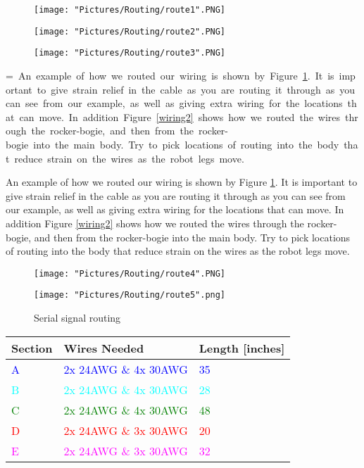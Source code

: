 \documentclass[12pt]{article}
\makeatletter
\newcommand{\mybox}[1]{%
  \setbox0=\hbox{#1}%
  \setlength{\@tempdima}{\dimexpr\wd0+13pt}%
  \begin{tcolorbox}[colframe=mycolor,boxrule=0.5pt,arc=4pt,
      left=6pt,right=6pt,top=6pt,bottom=6pt,boxsep=0pt,width=0.95\textwidth]
    #1
  \end{tcolorbox}
}
\makeatother
\begin{document}

\begin{figure}[H]
  	\centering
  	\begin{minipage}[b]{0.34\textwidth}
    		\texttt{[image: "Pictures/Routing/route1".PNG]}
  	\end{minipage}
  	\hfill
  	\begin{minipage}[b]{0.29\textwidth}
    		\texttt{[image: "Pictures/Routing/route2".PNG]}
  	\end{minipage}
    	\hfill
  	\begin{minipage}[b]{0.30\textwidth}
    		\texttt{[image: "Pictures/Routing/route3".PNG]}
  	\end{minipage}
  	\caption{}
	\label{wiring1}
\end{figure}


\mybox{
An example of how we routed our wiring is shown by Figure \ref{wiring1}. It is important to give strain relief in the cable as you are routing it through as you can see from our example, as well as giving extra wiring for the locations that can move. In addition Figure \ref{wiring2} shows how we routed the wires through the rocker-bogie, and then from the rocker-bogie into the main body. Try to pick locations of routing into the body that reduce strain on the wires as the robot legs move.
}

\begin{figure}[H]
 	\centering
  	\begin{minipage}[b]{0.48\textwidth}
		\texttt{[image: "Pictures/Routing/route4".PNG]}
  	\end{minipage}
  	\hfill
  	\begin{minipage}[b]{0.42\textwidth}
    		\texttt{[image: "Pictures/Routing/route5".png]}
  	\end{minipage}
	\caption{Serial signal routing}
	\label{ss2rc2}
\end{figure}




\begin{tabular}[3] {| p{2cm} | p{7cm} | p{4cm} |}
	\hline
	\textbf{Section} & \textbf{Wires Needed} & \textbf{Length [inches]}  \\ \hline
	\textcolor{blue}{A} & \textcolor{blue}{2x 24AWG \& 4x 30AWG} & \textcolor{blue}{35} \\ \hline
	\textcolor{cyan}{B} & \textcolor{cyan}{2x 24AWG \& 4x 30AWG} & \textcolor{cyan}{28} \\ \hline
	\textcolor{green}{C} & \textcolor{green}{2x 24AWG \& 4x 30AWG} & \textcolor{green}{48} \\ \hline
	\textcolor{red}{D} & \textcolor{red}{2x 24AWG \& 3x 30AWG} & \textcolor{red}{20} \\ \hline
	\textcolor{magenta}{E} & \textcolor{magenta}{2x 24AWG \& 3x 30AWG} & \textcolor{magenta}{32} \\ \hline
\end{tabular}
\end{document}
